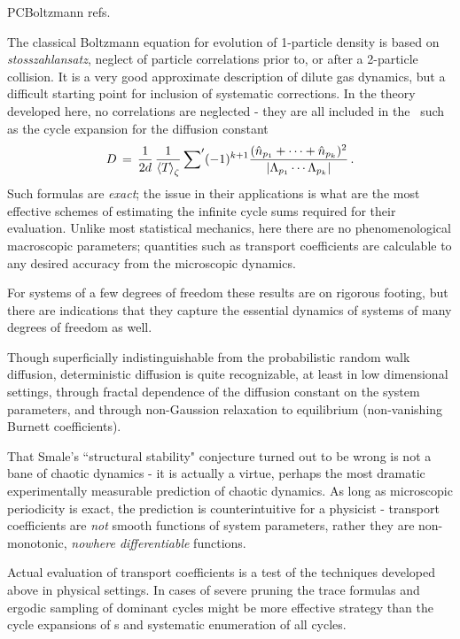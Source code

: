 PC{Boltzmann refs.}


The classical Boltzmann equation for evolution of 1-particle
density is based on {\em stosszahlansatz},
neglect of particle correlations prior to, or after a 2-particle
collision.
It is a very good approximate description of dilute gas dynamics,
but a difficult starting point for inclusion of systematic corrections.
In the theory developed here, no correlations are neglected - they
are all included in the \cycForm\ such as the cycle expansion for the
diffusion constant
\[
D \,=\,{1 \over 2 d } \, {1 \over \left\langle {{\ensuremath{T_{}}}} \right\rangle_\zeta}
\mathop{{\sum}'} (-1)^{k+1}
    \frac{
(\hat n_{p_1} + \cdots + \hat n_{p_k})^2
    }{
|\Lambda_{p_1} \cdots\Lambda_{p_k}|
    }
\, .
\]
Such formulas are {\em exact}; the issue in their applications is
what are the most effective schemes of estimating the infinite cycle
sums required for their evaluation. Unlike most statistical
mechanics, here there are no phenomenological macroscopic parameters;
quantities such as transport coefficients are calculable to any
desired accuracy from the microscopic dynamics.

For systems of a few degrees of freedom these results are on rigorous
footing, but there are indications that they capture the essential
dynamics of systems of many degrees of freedom as well.

Though superficially indistinguishable from the probabilistic random
walk diffusion, deterministic diffusion is quite recognizable, at
least in low dimensional settings, through fractal dependence of the
diffusion constant on the system parameters, and through non-Gaussion
relaxation to equilibrium (non-vanishing Burnett coefficients).

That Smale's ``structural stability" conjecture turned out to be
wrong is not a bane of chaotic dynamics - it is actually a virtue,
perhaps the most dramatic experimentally measurable prediction of
chaotic dynamics. As long as microscopic periodicity is exact, the
prediction is counterintuitive for a physicist - transport
coefficients are {\em not} smooth functions of system parameters,
rather they are non-monotonic, {\em nowhere differentiable}
functions.

Actual evaluation of transport coefficients is a test of the
techniques developed above in physical settings. In cases of severe
pruning the trace formulas and ergodic sampling of dominant cycles
might be more effective strategy than the cycle expansions of \dzeta
s and systematic enumeration of all cycles.


